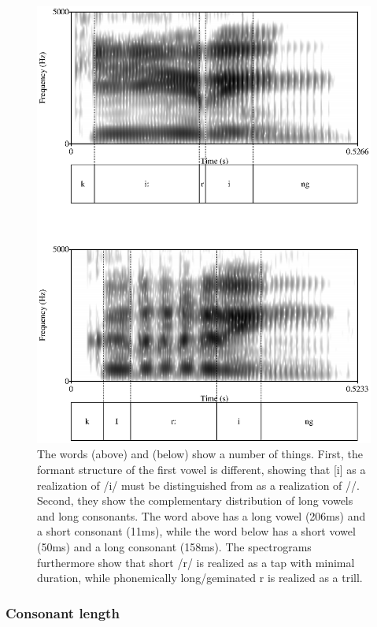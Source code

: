\begin{figure}
 \centering
 \includegraphics[width=.8\textwidth]{pics/kiiringkirring.eps}
 \caption[Differences in length and vowel quality between    and ]{The words  (above) and  (below) show a number of things. First, the formant structure of the first vowel is different, showing that [i] as a realization of /i/ must be distinguished from  as a realization of /\E/. Second, they show the complementary distribution of long vowels and long consonants. The word above has a long vowel (206ms) and a short consonant (11ms), while the word below has a short vowel (50ms) and a long consonant (158ms). The spectrograms furthermore show that short /r/ is realized as a tap with minimal duration, while phonemically long/geminated r is realized as a trill. }
 \label{fig:kiiringkirring}
\end{figure}

\subsubsection{Consonant length}\label{sec:phon:Consonantlength}


